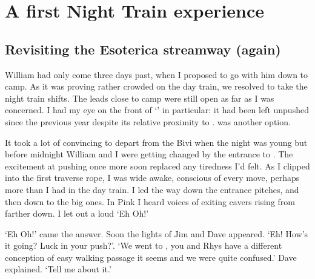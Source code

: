 \section{A first Night Train experience}
\begin{marginfigure}
\end{marginfigure}

\subsection{Revisiting the Esoterica streamway (again)}
William had only come three days past, when I proposed to go with him down to camp. As it was proving rather crowded on the day train, we resolved to take the night train shifts. The leads close to camp were still open as far as I was concerned. I had my eye on the front of `' in particular: it had been left unpushed since the previous year despite its relative proximity to .  was another option.

It took a lot of convincing to depart from the Bivi when the night was young but before midnight William and I were getting changed by the entrance to . The excitement at pushing once more soon replaced any tiredness I'd felt. As I clipped into the first traverse rope, I was wide awake, conscious of every move, perhaps more than I had in the day train. I led the way down the entrance pitches, and then down to the big ones. In Pink I heard voices of exiting cavers rising from farther down. I let out a loud `Eh Oh!'

 `Eh Oh!' came the answer. Soon the lights of Jim and Dave appeared. `Eh! How's it going? Luck in your push?'.
`We went to , you and Rhys have a different conception of easy walking passage it seems and we were quite confused.' Dave explained.
`Tell me about it.'

